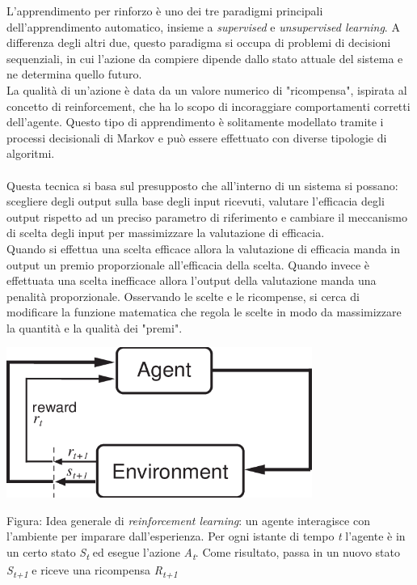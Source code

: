\documentclass[a4paper,12pt]{report}
\begin{document}
L'apprendimento per rinforzo \cite{rl} è uno dei tre paradigmi principali dell'apprendimento automatico, insieme a \textit{supervised} e \textit{unsupervised learning}. A differenza degli altri due, questo paradigma si occupa di problemi di decisioni sequenziali, in cui l'azione da compiere dipende dallo stato attuale del sistema e ne determina quello futuro.\\
La qualità di un'azione è data da un valore numerico di "ricompensa", ispirata al concetto di reinforcement, che ha lo scopo di incoraggiare comportamenti corretti dell'agente. Questo tipo di apprendimento è solitamente modellato tramite i processi decisionali di Markov e può essere effettuato con diverse tipologie di algoritmi.\\~\\
Questa tecnica si basa sul presupposto che all'interno di un sistema si possano: scegliere degli output sulla base degli input ricevuti, valutare l'efficacia degli output rispetto ad un preciso parametro di riferimento e cambiare il meccanismo di scelta degli input per massimizzare la valutazione di efficacia.\\
Quando si effettua una scelta efficace allora la valutazione di efficacia manda in output un premio proporzionale all'efficacia della scelta. Quando invece è effettuata una scelta inefficace allora l'output della valutazione manda una penalità proporzionale. Osservando le scelte e le ricompense, si cerca di modificare la funzione matematica che regola le scelte in modo da massimizzare la quantità e la qualità dei "premi".\\

\begin{fig}
	\begin{center}
			\includegraphics[width=10cm]{rl}
	\end{center}
	\caption{Figura: Idea generale di \textit{reinforcement learning}: un agente interagisce con l'ambiente per imparare dall'esperienza. Per ogni istante di tempo \textit{t} l'agente è in un certo stato \textit{S\textsubscript{t}} ed esegue l'azione \textit{A\textsubscript{t}}. Come risultato, passa in un nuovo stato \textit{S\textsubscript{t+1}} e riceve una ricompensa \textit{R\textsubscript{t+1}}}
\end{fig}
\end{document}
